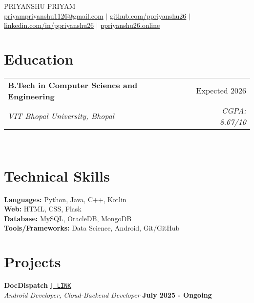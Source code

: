 \documentclass[a4paper,10pt]{article}
\makeatletter
\newcommand{\resumeSubheading}[4]{
  \vspace{1pt}\item
    \begin{tabular*}{\textwidth}{l@{\extracolsep{\fill}}r}
      \textbf{#1} & #2 \\
      \textit{\small#3} & \textit{\small #4} \\
    \end{tabular*}
}
\makeatother
\begin{document}
\begin{center}
  {\Huge \scshape PRIYANSHU PRIYAM} \\ \vspace{1pt}
  \href{mailto:priyampriyanshu1126@gmail.com}{priyampriyanshu1126@gmail.com} $|$
  \href{https://github.com/ppriyanshu26}{github.com/ppriyanshu26} $|$
  \href{https://linkedin.com/in/ppriyanshu26}{linkedin.com/in/ppriyanshu26} $|$
  \href{https://ppriyanshu26.online/}{ppriyanshu26.online}
\end{center}

\section{Education}

\vspace{-4pt}
\begin{flushleft}
  \hspace{1.5em}
  \resumeSubheading
    {B.Tech in Computer Science and Engineering}{Expected 2026}
    {VIT Bhopal University, Bhopal}{CGPA: 8.67/10} \\[-4pt]
\end{flushleft}

\section{Technical Skills}

\vspace{-4pt}
\hspace{1.5em}
\begin{flushleft}
  \textbf{Languages:} Python, Java, C++, Kotlin \\[2pt]
  \textbf{Web:} HTML, CSS, Flask \\[2pt]
  \textbf{Database:} MySQL, OracleDB, MongoDB \\[2pt]
  \textbf{Tools/Frameworks:} Data Science, Android, Git/GitHub
\end{flushleft}

\section{Projects}

\noindent
\textbf{DocDispatch}
\href{https://github.com/yashpreeto7/DocDispatch}{\texttt{| LINK}} \\
\textit{Android Developer, Cloud-Backend Developer} \hfill \textbf{July 2025 - Ongoing} \\[-8pt]
\end{document}
